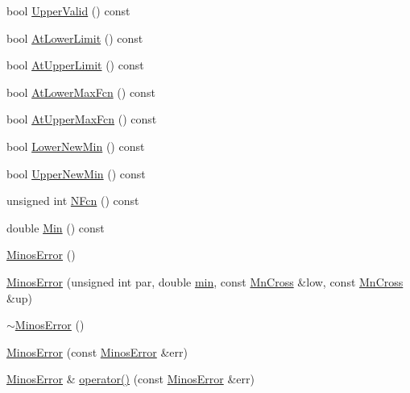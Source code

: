 \begin{DoxyCompactItemize}
\item 
bool \mbox{\hyperlink{classROOT_1_1Minuit2_1_1MinosError_a4180ae7ff87d9a2c0942c8e6ac81a8c0}{Upper\+Valid}} () const
\item 
bool \mbox{\hyperlink{classROOT_1_1Minuit2_1_1MinosError_ab5bac1c70b34e42714730cad95978b51}{At\+Lower\+Limit}} () const
\item 
bool \mbox{\hyperlink{classROOT_1_1Minuit2_1_1MinosError_a6c8a60e5b855f9d7164f441ea69c75eb}{At\+Upper\+Limit}} () const
\item 
bool \mbox{\hyperlink{classROOT_1_1Minuit2_1_1MinosError_a6ec22eac3b7dd1a281f1df710ed1dc74}{At\+Lower\+Max\+Fcn}} () const
\item 
bool \mbox{\hyperlink{classROOT_1_1Minuit2_1_1MinosError_a940c974f6ac87d22c4d340ef2fc88e8c}{At\+Upper\+Max\+Fcn}} () const
\item 
bool \mbox{\hyperlink{classROOT_1_1Minuit2_1_1MinosError_a9a806056992d1acb26420bf4895b46e9}{Lower\+New\+Min}} () const
\item 
bool \mbox{\hyperlink{classROOT_1_1Minuit2_1_1MinosError_a5f37bb106903e148029b8461f9bbbe25}{Upper\+New\+Min}} () const
\item 
unsigned int \mbox{\hyperlink{classROOT_1_1Minuit2_1_1MinosError_a4956b01f7899f42847617c378e5c86c2}{N\+Fcn}} () const
\item 
double \mbox{\hyperlink{classROOT_1_1Minuit2_1_1MinosError_a109ad5c9e19a97bda32f506718eaef02}{Min}} () const
\item 
\mbox{\hyperlink{classROOT_1_1Minuit2_1_1MinosError_a5cb0fad5d73d20905a57fb1c505c9fd2}{Minos\+Error}} ()
\item 
\mbox{\hyperlink{classROOT_1_1Minuit2_1_1MinosError_a400609986f7b4e3a93eab1a35e1f33ce}{Minos\+Error}} (unsigned int par, double \mbox{\hyperlink{adat__devel_2lib_2SU3_2SU3__internal_8h_ab0f5fed3171eb00d1c5f037d9f518a23}{min}}, const \mbox{\hyperlink{classROOT_1_1Minuit2_1_1MnCross}{Mn\+Cross}} \&low, const \mbox{\hyperlink{classROOT_1_1Minuit2_1_1MnCross}{Mn\+Cross}} \&up)
\item 
\mbox{\hyperlink{classROOT_1_1Minuit2_1_1MinosError_a8373afe22cd395ed995a061691c48dad}{$\sim$\+Minos\+Error}} ()
\item 
\mbox{\hyperlink{classROOT_1_1Minuit2_1_1MinosError_a95d558825494f594da873fef3518572e}{Minos\+Error}} (const \mbox{\hyperlink{classROOT_1_1Minuit2_1_1MinosError}{Minos\+Error}} \&err)
\item 
\mbox{\hyperlink{classROOT_1_1Minuit2_1_1MinosError}{Minos\+Error}} \& \mbox{\hyperlink{classROOT_1_1Minuit2_1_1MinosError_ac45b7f3397fe4c13e1811b486e10602a}{operator()}} (const \mbox{\hyperlink{classROOT_1_1Minuit2_1_1MinosError}{Minos\+Error}} \&err)

\end{DoxyCompactItemize}
